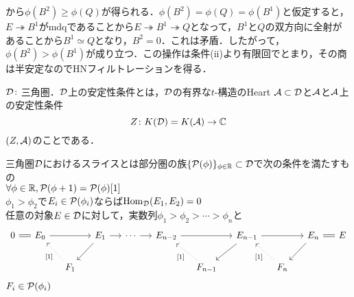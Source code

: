 \begin{pf}
\begin{center}
\end{center}
から$\phi(B^2)\ge\phi(Q)$が得られる．$\phi(B^2)=\phi(Q)=\phi(B^1)$と仮定すると，$E\twoheadrightarrow B^1$がmdqであることから$E\twoheadrightarrow B^1\twoheadrightarrow Q$となって，$B^1$と$Q$の双方向に全射があることから$B^1\simeq Q$となり，$B^2=0$．これは矛盾．したがって，$\phi(B^2)>\phi(B^1)$が成り立つ．この操作は条件(ii)より有限回でとまり，その商は半安定なのでHNフィルトレーションを得る．
\end{pf}

\begin{defn}
	$\D\colon$三角圏．$\D$上の安定性条件とは，$\D$の有界な$t$-構造のHeart $\A\subset\D$と$\A$と$\A$上の安定性条件
	\[Z\colon K(\D)=K(\A)\to\CC\]
	$(Z,\A)$のことである．
\end{defn}

\begin{defn}
	三角圏$\D$におけるスライスとは部分圏の族$\{\P(\phi)\}_{\phi\in\RR}\subset\D$で次の条件を満たすもの\\
	\bullet $\forall\phi\in\RR, \P(\phi + 1) = \P(\phi)[1]$\\
	\bullet $\phi_1>\phi_2$で$E_i\in\P(\phi_i)$ならば$\Hom_{\D}(E_1,E_2)=0$\\
	\bullet 任意の対象$E\in\D$に対して，実数列$\phi_1>\phi_2>\cdots >\phi_n$と
	\[
		\begin{tikzcd}[column sep=1.3em]
			0\ar[r,equal]&E_0\ar[rr]& & E_{1}\ar[r]\ar[ld] &\cdots\ar[r] &E_{n-2}\ar[rr]&&E_{n-1}\ar[ld]\ar[rr]&&E_n\ar[ld]\ar[r,equal]&E\\
									 &&F_{1}\ar[lu,dotted,"{[1]}"] &&&&F_{n-1}\ar[lu,dotted,"{[1]}"]&&F_n\ar[lu,dotted,"{[1]}"]
		\end{tikzcd}
	\]
	$F_i\in\P(\phi_i)$
\end{defn}

